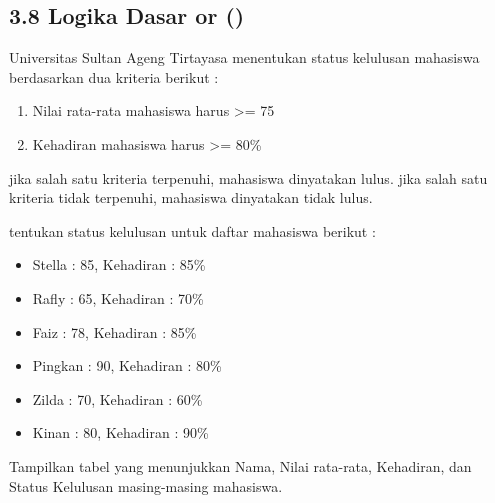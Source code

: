 \documentclass[
]{article}
\providecommand{\tightlist}{%
  \setlength{\itemsep}{0pt}\setlength{\parskip}{0pt}}
\begin{document}
\subsection{3.8 Logika Dasar or (\textbar)}\label{logika-dasar-or}

Universitas Sultan Ageng Tirtayasa menentukan status kelulusan mahasiswa
berdasarkan dua kriteria berikut :

\begin{enumerate}
\def\labelenumi{\arabic{enumi}.}
\tightlist
\item
  Nilai rata-rata mahasiswa harus \textgreater= 75
\item
  Kehadiran mahasiswa harus \textgreater= 80\%
\end{enumerate}

jika salah satu kriteria terpenuhi, mahasiswa dinyatakan lulus. jika
salah satu kriteria tidak terpenuhi, mahasiswa dinyatakan tidak lulus.

tentukan status kelulusan untuk daftar mahasiswa berikut :

\begin{itemize}
\item
  Stella : 85, Kehadiran : 85\%
\item
  Rafly : 65, Kehadiran : 70\%
\item
  Faiz : 78, Kehadiran : 85\%
\item
  Pingkan : 90, Kehadiran : 80\%
\item
  Zilda : 70, Kehadiran : 60\%
\item
  Kinan : 80, Kehadiran : 90\%
\end{itemize}

Tampilkan tabel yang menunjukkan Nama, Nilai rata-rata, Kehadiran, dan
Status Kelulusan masing-masing mahasiswa.
\end{document}
